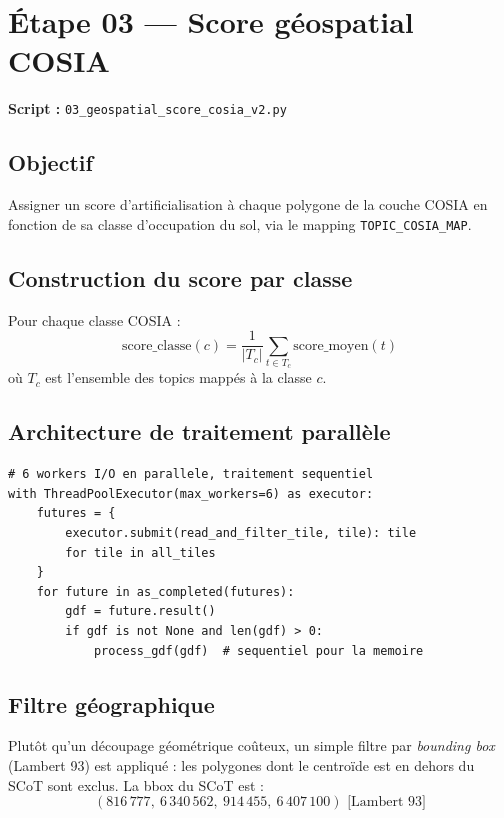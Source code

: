 \documentclass[11pt,a4paper]{report}
\newcommand{\code}[1]{\texttt{\small #1}}
\newcommand{\cosia}{\textsc{COSIA}}
\begin{document}
\section{Étape 03 — Score géospatial COSIA}

\textbf{Script :} \code{03\_geospatial\_score\_cosia\_v2.py}

\subsection{Objectif}

Assigner un score d'artificialisation à chaque polygone de la couche \cosia{} en fonction de sa classe d'occupation du sol, via le mapping \code{TOPIC\_COSIA\_MAP}.

\subsection{Construction du score par classe}

Pour chaque classe COSIA :
$$
\text{score\_classe}(c) = \frac{1}{|T_c|} \sum_{t \in T_c} \text{score\_moyen}(t)
$$
où $T_c$ est l'ensemble des topics mappés à la classe $c$.

\subsection{Architecture de traitement parallèle}

\begin{lstlisting}[language=Python3, caption={Lecture parallèle des tuiles COSIA}]
# 6 workers I/O en parallele, traitement sequentiel
with ThreadPoolExecutor(max_workers=6) as executor:
    futures = {
        executor.submit(read_and_filter_tile, tile): tile
        for tile in all_tiles
    }
    for future in as_completed(futures):
        gdf = future.result()
        if gdf is not None and len(gdf) > 0:
            process_gdf(gdf)  # sequentiel pour la memoire
\end{lstlisting}

\subsection{Filtre géographique}

Plutôt qu'un découpage géométrique coûteux, un simple filtre par \textit{bounding box} (Lambert 93) est appliqué : les polygones dont le centroïde est en dehors du SCoT sont exclus. La bbox du SCoT est :
$$
(816\,777,\ 6\,340\,562,\ 914\,455,\ 6\,407\,100) \text{ [Lambert 93]}
$$
\end{document}
